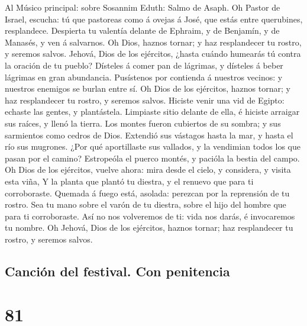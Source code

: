  Al Músico principal: sobre Sosannim Eduth: Salmo de
Asaph. Oh Pastor de Israel, escucha: tú que pastoreas como á ovejas á
José, que estás entre querubines, resplandece.  Despierta
tu valentía delante de Ephraim, y de Benjamín, y de Manasés, y ven á
salvarnos.  Oh Dios, haznos tornar; y haz resplandecer tu
rostro, y seremos salvos.  Jehová, Dios de los ejércitos,
¿hasta cuándo humearás tú contra la oración de tu pueblo? 
Dísteles á comer pan de lágrimas, y dísteles á beber lágrimas en gran
abundancia.  Pusístenos por contienda á nuestros vecinos:
y nuestros enemigos se burlan entre sí.  Oh Dios de los
ejércitos, haznos tornar; y haz resplandecer tu rostro, y seremos
salvos.  Hiciste venir una vid de Egipto: echaste las
gentes, y plantástela.  Limpiaste sitio delante de ella, é
hiciste arraigar sus raíces, y llenó la tierra.  Los
montes fueron cubiertos de su sombra; y sus sarmientos como cedros de
Dios.  Extendió sus vástagos hasta la mar, y hasta el río
sus mugrones.  ¿Por qué aportillaste sus vallados, y la
vendimian todos los que pasan por el camino?  Estropeóla
el puerco montés, y pacióla la bestia del campo.  Oh Dios
de los ejércitos, vuelve ahora: mira desde el cielo, y considera, y
visita esta viña,  Y la planta que plantó tu diestra, y
el renuevo que para ti corroboraste.  Quemada á fuego
está, asolada: perezcan por la reprensión de tu rostro. 
Sea tu mano sobre el varón de tu diestra, sobre el hijo del hombre que
para ti corroboraste.  Así no nos volveremos de ti: vida
nos darás, é invocaremos tu nombre.  Oh Jehová, Dios de
los ejércitos, haznos tornar; haz resplandecer tu rostro, y seremos
salvos.

\hypertarget{canciuxf3n-del-festival.-con-penitencia}{%
\subsection{Canción del festival. Con
penitencia}\label{canciuxf3n-del-festival.-con-penitencia}}

\hypertarget{section-80}{%
\section{81}\label{section-80}}

